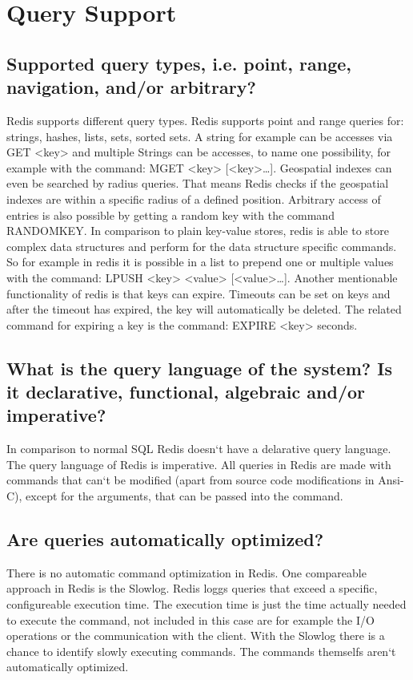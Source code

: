 \chapter{Query Support}

\section{Supported query types, i.e. point, range, navigation, and/or arbitrary?}
Redis supports different query types. Redis supports point and range queries for:
strings, hashes, lists, sets, sorted sets. A string for example can be accesses via GET <key> and multiple Strings can be accesses, to name one possibility, for example with the command: MGET <key> [<key>…]. Geospatial indexes can even be searched by radius queries. That means Redis checks if the geospatial indexes are within a specific radius of a defined
position. Arbitrary access of entries is also possible by getting a random key with the command RANDOMKEY. In comparison to plain key-value stores, redis is able to store complex data structures and perform for the data structure specific commands. So for example in redis it is possible in a list to prepend one or multiple values with the command: LPUSH <key> <value> [<value>…]. Another mentionable functionality of redis is that keys can expire. Timeouts can be set on keys and after the timeout has expired, the key will automatically be deleted. The related command for expiring a key is the command: EXPIRE <key> {seconds}.

\section{What is the query language of the system? Is it declarative, functional, algebraic and/or imperative?}
In comparison to normal SQL Redis doesn‘t have a delarative query language. The query language of Redis is imperative. All queries in Redis are made with commands that can‘t be modified (apart from source code modifications in Ansi-C), except for the arguments, that can be passed into the command.

\section{Are queries automatically optimized?}
There is no automatic command optimization in Redis. One compareable approach in Redis is the Slowlog. Redis loggs queries that exceed a specific, configureable execution time. The execution time is just the time actually needed to execute the command, not included in this case are for example the I/O operations or the communication with the client. With the Slowlog there is a chance to identify slowly executing commands. The commands themselfs aren‘t automatically optimized.
